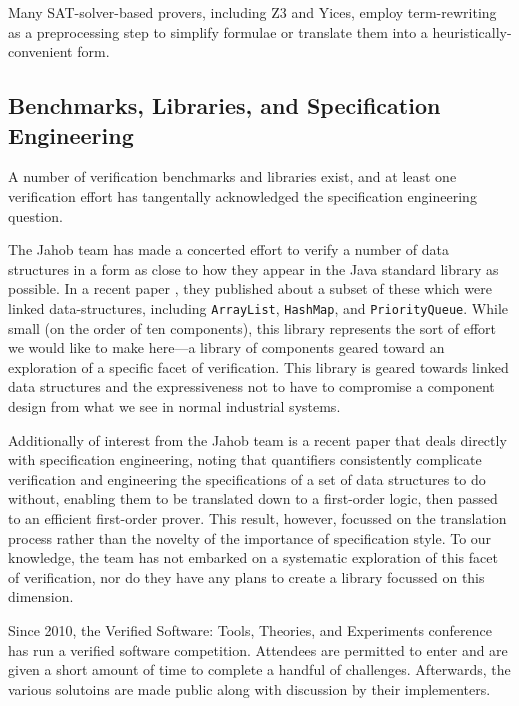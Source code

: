 Many SAT-solver-based provers, including Z3 and Yices, employ term-rewriting as a preprocessing step to simplify formulae or translate them into a heuristically-convenient form.

\subsection{Benchmarks, Libraries, and Specification Engineering}\label{sec:overviewEngineering}
A number of verification benchmarks and libraries exist, and at least one verification effort has tangentally acknowledged the specification engineering question.

The Jahob team has made a concerted effort to verify a number of data structures in a form as close to how they appear in the Java standard library as possible.  In a recent paper \cite{zee:annotations}, they published about a subset of these which were linked data-structures, including \texttt{ArrayList}, \texttt{HashMap}, and \texttt{PriorityQueue}.  While small (on the order of ten components), this library represents the sort of effort we would like to make here---a library of components geared toward an exploration of a specific facet of verification.  This library is geared towards linked data structures and the expressiveness not to have to compromise a component design from what we see in normal industrial systems.  

Additionally of interest from the Jahob team is a recent paper\cite{bouillaguetJahobFirstOrder} that deals directly with specification engineering, noting that quantifiers consistently complicate verification and engineering the specifications of a set of data structures to do without, enabling them to be translated down to a first-order logic, then passed to an efficient first-order prover.  This result, however, focussed on the translation process rather than the novelty of the importance of specification style.  To our knowledge, the team has not embarked on a systematic exploration of this facet of verification, nor do they have any plans to create a library focussed on this dimension.

Since 2010, the Verified Software: Tools, Theories, and Experiments conference has run a verified software competition.  Attendees are permitted to enter and are given a short amount of time to complete a handful of challenges.  Afterwards, the various solutoins are made public along with discussion by their implementers.

